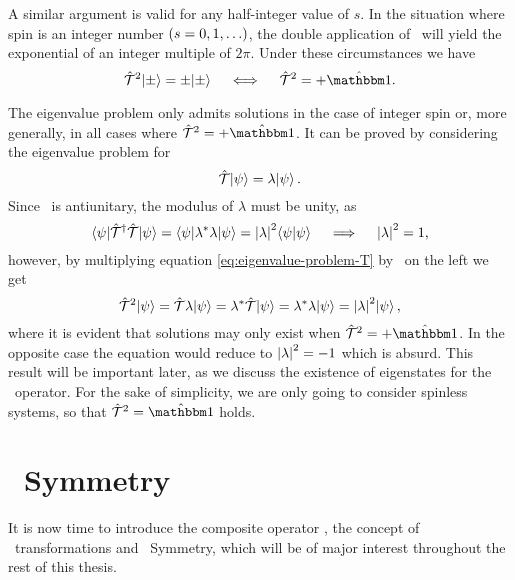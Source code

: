             A similar argument is valid for any half-integer value of $s$. In the situation where spin is an integer number $\pqty{s = 0,1,\ldots}$, the double application of \hK\ will yield the exponential of an integer multiple of $2\pi$. Under these circumstances we have
            \begin{equation*}
                \hT^2\! \ket{\pm} = \pm\!\ket{\pm}
                \quad\iff\quad
                \hT^2 = +\togglehat{\idM}
                \myperiod
            \end{equation*}

            The eigenvalue problem only admits solutions in the case of integer spin or, more generally, in all cases where $\hT^2 = +\togglehat{\idM}$. It can be proved by considering the eigenvalue problem for \hT
            \begin{equation}
                \label{eq:eigenvalue-problem-T}
                \mathcal{\hat{T}}\! \ket{\psi} = \lambda\! \ket{\psi}
                \text{.}
            \end{equation}
            Since \hT\ is antiunitary, the modulus of $\lambda$ must be unity, as
            \begin{equation*}
                \bra{\psi}\!\mathcal{\hat{T}}^\dag \mathcal{\hat{T}} \!\ket{\psi}
                = \bra{\psi} \!\lambda^* \lambda\!\ket{\psi}
                = \abs{\lambda}^2 \!\braket{\psi}{\psi}
                \quad\implies\quad
                \abs{\lambda}^2 = 1
                \text{,}
            \end{equation*}
            however, by multiplying equation \eqref{eq:eigenvalue-problem-T} by \hT\ on the left we get
            \begin{equation*}
                \mathcal{\hat{T}}^2\! \ket{\psi}
                = \mathcal{\hat{T}} \lambda\! \ket{\psi}
                = \lambda^* \mathcal{\hat{T}}\! \ket{\psi}
                = \lambda^* \lambda\! \ket{\psi}
                = \abs{\lambda}^2\! \ket{\psi}
                \text{,}
            \end{equation*}
            where it is evident that solutions may only exist when $\hT^2 = +\togglehat{\idM}$. In the opposite case the equation would reduce to $\abs{\lambda}^2 = -1$ which is absurd. This result will be important later, as we discuss the existence of eigenstates for the \hPT\ operator. For the sake of simplicity, we are only going to consider spinless systems, so that $\hT^2 = \togglehat{\idM}$ holds.

    \section{\PT\ Symmetry}\label{s:pt-symmetry}
        It is now time to introduce the composite operator \hPT, the concept of \PT\ transformations and \PT\ Symmetry, which will be of major interest throughout the rest of this thesis.

